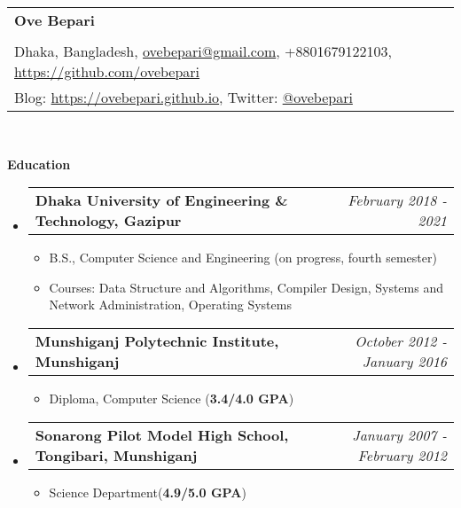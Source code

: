 \documentclass[letterpaper,10pt]{article}
\makeatletter
\newcommand{\resheading}[1]{{\large \colorbox{mygrey}{\begin{minipage}{\textwidth}{\textbf{#1 \vphantom{p\^{E}}}}\end{minipage}}}}
\newcommand{\ressubheading}[4]{
	\begin{tabular*}{7.1in}{l@{\extracolsep{\fill}}r}
		\textbf{#1} & \textit{#4} \\
	\end{tabular*}\vspace{-6pt}}
\makeatother
\begin{document}
	
	\begin{tabular*}{7.5in}{l@{\extracolsep{\fill}}}
		\textbf{\large Ove Bepari}\\
		\\
		
		Dhaka, Bangladesh, \href{mailto:ovebepari@gmail.com}{ovebepari@gmail.com}, +8801679122103, \url{https://github.com/ovebepari} \\
		 Blog: \url{https://ovebepari.github.io}, Twitter: \href{https://twitter.com/ovebepari}{@ovebepari}
	
		\\

	\end{tabular*}
	\\
	
	\vspace{0.3in}
	
	\resheading{Education}
	\begin{itemize}
		
				
		\item \ressubheading{Dhaka University of Engineering \& Technology, Gazipur}{}{}{February 2018 - 2021}
		\begin{itemize}
			\item B.S., Computer Science and Engineering (on progress, fourth semester)
			\item Courses: Data Structure and Algorithms, Compiler Design, Systems and Network Administration, Operating Systems
		\end{itemize}
	
				
		\item \ressubheading{Munshiganj Polytechnic Institute, Munshiganj}{}{}{October 2012 - January 2016}
		\begin{itemize}
			\item Diploma, Computer Science (\textbf{3.4/4.0 GPA})
		\end{itemize}
		
		
		\item \ressubheading{Sonarong Pilot Model High School, Tongibari, Munshiganj}{}{}{January 2007 - February 2012}
		\begin{itemize}
			\item Science Department(\textbf{4.9/5.0 GPA})
		\end{itemize}

	
	\end{itemize}
	
	
	\vspace{0.2in}
	
\end{document}
